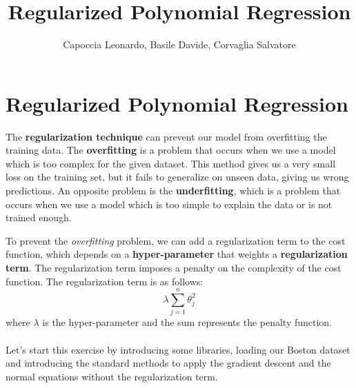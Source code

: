 \documentclass[11pt]{article}
\title{Regularized Polynomial Regression}
\begin{document}
    
    \author{Capoccia Leonardo,
    Basile Davide, Corvaglia
    Salvatore}    
    
    \maketitle
    
    

    
    \hypertarget{regularized-polynomial-regression}{%
\section{Regularized Polynomial
Regression}\label{regularized-polynomial-regression}}

The \textbf{regularization technique} can prevent our model from overfitting the training data. The \textbf{overfitting} is a problem that occurs when we use a model which is too complex for the given dataset. This method gives us a very small loss on the training set, but it fails to generalize on unseen data, giving us wrong predictions.
An opposite problem is the \textbf{underfitting}, which is a problem that occurs when we use a model which is too simple to explain the data or is not trained enough.

To prevent the \textit{overfitting} problem, we can add a regularization term to the cost function, which depends on a \textbf{hyper-parameter} that weights a \textbf{regularization term}. The regularization term imposes a penalty on the complexity of the cost function. The regularization term is as follows:
\[ \lambda \sum_{j=1}^n \theta_j^2 \] where \(\lambda\) is the
hyper-parameter and the sum represents the penalty function.
\\ \\
Let’s start this exercise by introducing some libraries, loading our Boston dataset and introducing the standard methods to apply the gradient descent and the normal equations without the regularization term.
\end{document}
